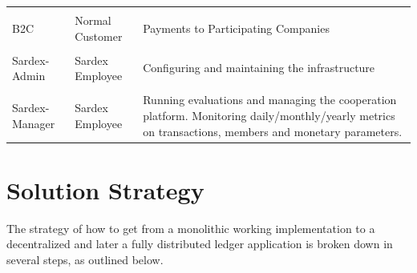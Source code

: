 \begin{longtable}[]{@{}lll@{}}
\tabularnewline
\tabularnewline
\begin{minipage}[t]{0.18\columnwidth}B2C \end{minipage} &
\begin{minipage}[t]{0.37\columnwidth}Normal Customer \end{minipage} &
\begin{minipage}[t]{0.37\columnwidth}Payments to Participating Companies\end{minipage}
\tabularnewline
\tabularnewline
\begin{minipage}[t]{0.18\columnwidth}Sardex-Admin \end{minipage} &
\begin{minipage}[t]{0.37\columnwidth}Sardex Employee \end{minipage} &
\begin{minipage}[t]{0.37\columnwidth}Configuring and maintaining the infrastructure\end{minipage}
\tabularnewline
\tabularnewline
\begin{minipage}[t]{0.18\columnwidth}Sardex-Manager \end{minipage} &
\begin{minipage}[t]{0.37\columnwidth}Sardex Employee \end{minipage} &
\begin{minipage}[t]{0.37\columnwidth}Running evaluations and managing the cooperation platform. Monitoring daily/monthly/yearly metrics on transactions, members and monetary parameters.\end{minipage}
\tabularnewline


\bottomrule
\end{longtable}

\section{Solution Strategy}\label{section-solution-strategy}
The strategy of how to get from a monolithic working implementation to a decentralized and later a fully distributed ledger application is broken down in several steps, as outlined below.

